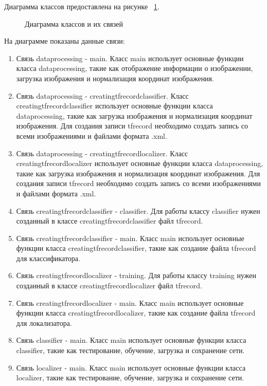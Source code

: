 Диаграмма классов предоставлена на рисунке ~\ref{classdiag:image}.

\begin{figure}[H]
\caption{Диаграмма классов и их связей}
\label{classdiag:image}
\end{figure}

На диаграмме показаны данные связи:
\begin{enumerate}
	\item Связь dataprocessing - main. Класс main использует основные функции класса dataprocessing, такие как отображение информации о изображении, загрузка изображения и нормализация координат изображения.
	\item Связь dataprocessing - creatingtfrecordclassifier. Класс creatingtfrecordclassifier использует основные функции класса dataprocessing, такие как загрузка изображения и нормализация координат изображения. Для создания записи tfrecord необходимо создать запись со всеми изображениями и файлами формата .xml.
	\item Связь dataprocessing - creatingtfrecordlocalizer. Класс creatingtfrecordlocalizer использует основные функции класса dataprocessing, такие как загрузка изображения и нормализация координат изображения. Для создания записи tfrecord необходимо создать запись со всеми изображениями и файлами формата .xml.
	\item Связь creatingtfrecordclassifier - classifier. Для работы классу classifier нужен созданный в классе creatingtfrecordclassifier файл tfrecord.
	\item Связь creatingtfrecordclassifier - main.  Класс main использует основные функции класса creatingtfrecordclassifier, такие как создание файла tfrecord для классификатора.
	\item Связь creatingtfrecordlocalizer - training. Для работы классу training нужен созданный в классе creatingtfrecordlocalizer файл tfrecord.
	\item Связь creatingtfrecordlocalizer - main.  Класс main использует основные функции класса creatingtfrecordlocalizer, такие как создание файла tfrecord для локализатора.
	\item Связь classifier - main. Класс main использует основные функции класса classifier, такие как тестирование, обучение, загрузка и сохранение сети.
	\item Связь localizer - main. Класс main использует основные функции класса localizer, такие как тестирование, обучение, загрузка и сохранение сети.
\end{enumerate}



